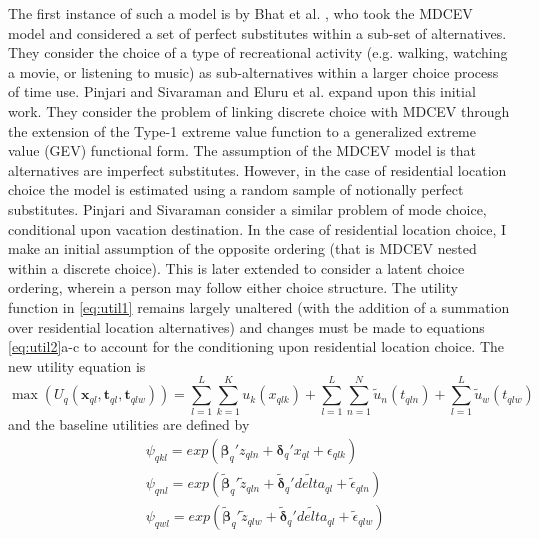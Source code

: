 The first instance of such a model is by Bhat et al. \cite{Bhat2006ADecisions}, who took the MDCEV model and considered a set of perfect substitutes within a sub-set of alternatives. They consider the choice of a type of recreational activity (e.g. walking, watching a movie, or listening to music) as sub-alternatives within a larger choice process of time use. Pinjari and Sivaraman \cite{RawoofPinjari2012ASystem} and Eluru et al. \cite{Eluru2010AChoices} expand upon this initial work. They consider the problem of linking discrete choice with MDCEV through the extension of the Type-1 extreme value function to a generalized extreme value (GEV) functional form. The assumption of the MDCEV model is that alternatives are imperfect substitutes. However, in the case of residential location choice the model is estimated using a random sample of notionally perfect substitutes. Pinjari and Sivaraman \cite{RawoofPinjari2012ASystem} consider a similar problem of mode choice, conditional upon vacation destination. In the case of residential location choice, I make an initial assumption of the opposite ordering (that is MDCEV nested within a discrete choice). This is later extended to consider a latent choice ordering, wherein a person may follow either choice structure. The utility function in \ref{eq:util1} remains largely unaltered (with the addition of a summation over residential location alternatives) and changes must be made to equations \ref{eq:util2}a-c to account for the conditioning upon residential location choice. The new utility equation is
\begin{equation}\label{eq:util3}
    \max(U_q(\bm{x}_{ql},\bm{t}_{ql},\bm{t}_{qlw})) = \sum_{l=1}^L\sum_{k=1}^K u_k(x_{qlk}) + \sum_{l=1}^L\sum_{n=1}^N\widetilde{u}_n(t_{qln}) + \sum_{l=1}^L\widetilde{u}_w(t_{qlw})
\end{equation}
and the baseline utilities are defined by
\begin{subequations}\label{eq:base1}
    \begin{align}
    &\psi_{qkl} = exp(\bm{\beta}_q' z_{qln} + \bm{\delta}_q' x_{ql} + \epsilon_{qlk}) \\
    &\psi_{qnl} = exp(\bm{\widetilde{\beta}}_q' \widetilde{z}_{qln} + \bm{\widetilde{\delta}}_q' \widetilde{delta}_{ql} + \widetilde{\epsilon}_{qln}) \\
    &\psi_{qwl} = exp(\bm{\widetilde{\beta}}_q' \widetilde{z}_{qlw} + \bm{\widetilde{\delta}}_q' \widetilde{delta}_{ql} + \widetilde{\epsilon}_{qlw}) \\
    \end{align}
\end{subequations}

